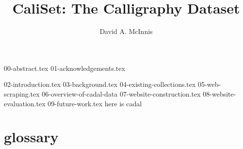 \documentclass{ewuthesis}
\begin{document}
    \title{CaliSet: The Calligraphy Dataset}
    \author{David A. McInnis}    
    
    
    
    
    \frontmatter
    \maketitle
    \makesigpage
    \makelibrarystatement{}
    {00-abstract.tex}
    {01-acknowledgements.tex}
    \mainmatter
    \tableofcontents
    \listoffigures{}
    {02-introduction.tex}
    {03-background.tex}
    {04-existing-collections.tex}
    {05-web-scraping.tex}
    {06-overview-of-cadal-data}
    {07-website-construction.tex}
    {08-website-evaluation.tex}
    {09-future-work.tex}
    here is \gls{cadal}
    \chapter{glossary}

% 


% 


    \backmatter
   

    
    \makevita
    
    
\end{document}
